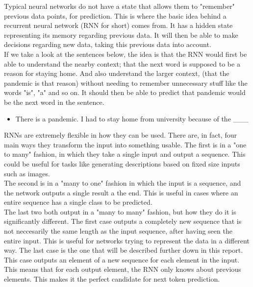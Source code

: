 Typical neural networks do not have a state that allows them to "remember" previous data points, for prediction. This is where the basic idea behind a recurrent neural network (RNN for short) comes from. It has a hidden state representing its memory regarding previous data. It will then be able to make decisions regarding new data, taking this previous data into account.\\

\noindent
If we take a look at the sentences below, the idea is that the RNN would first be able to understand the nearby context; that the next word is supposed to be a reason for staying home. And also understand the larger context, (that the pandemic is that reason) without needing to remember unnecessary stuff like the words "is", "a" and so on. It should then be able to predict that pandemic would be the next word in the sentence. \\

\begin{itemize}
    \item There is a pandemic. I had to stay home from university because of the \_\_\_
\end{itemize}

\noindent
RNNs are extremely flexible in how they can be used. There are, in fact, four main ways they transform the input into something usable.
The first is in a "one to many" fashion, in which they take a single input and output a sequence. This could be useful for tasks like generating descriptions based on fixed size inputs such as images. \\

\noindent
The second is in a "many to one" fashion in which the input is a sequence, and the network outputs a single result a the end. This is useful in cases where an entire sequence has a single class to be predicted.\\

\noindent
The last two both output in a "many to many" fashion, but how they do it is significantly different. The first case outputs a completely new sequence that is not neccesarily the same length as the input sequence, after having seen the entire input. This is useful for networks trying to represent the data in a different way. The last case is the one that will be described further down in this report. This case outputs an element of a new sequence for each element in the input. This means that for each output element, the RNN only knows about previous elements. This makes it the perfect candidate for next token prediction.

